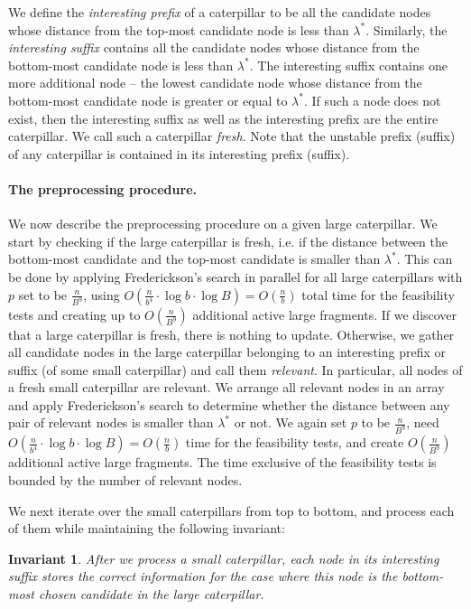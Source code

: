 \documentclass[11pt,a4paper]{article}
\newtheorem{invariant}{Invariant}
\theoremstyle{definition}
\theoremstyle{remark}
\begin{document}
We define the \emph{interesting prefix} of a caterpillar to be all the candidate nodes whose distance from the top-most candidate node is less than $\lambda^*$.
Similarly, the \emph{interesting suffix} contains all the candidate nodes whose distance from the bottom-most candidate node is less than $\lambda^*$. The interesting suffix contains one more additional node -- the lowest candidate node whose distance from the bottom-most candidate node is greater or equal to $\lambda^*$. If such a node does not exist, then the interesting suffix as well as the interesting prefix are the entire caterpillar. We call such a caterpillar \emph{fresh}. Note that the unstable prefix (suffix) of any caterpillar is contained in its interesting prefix (suffix).

\paragraph{The preprocessing procedure.}
We now describe the preprocessing procedure on a given large caterpillar. We start by checking if the large caterpillar is fresh, i.e. if the distance between the bottom-most candidate and the top-most candidate is smaller than $\lambda^*$. This can be
done by applying Frederickson's search in parallel for all large caterpillars with $p$ set to
be $\frac{n}{B^{9}}$, using $O(\frac{n}{b^{4}}\cdot \log b \cdot \log B)=O(\frac{n}{b})$
total time for the feasibility tests and creating up to $O(\frac{n}{B^{9}})$ additional active large
fragments. If we discover that a large caterpillar is fresh, there is nothing to update. 
Otherwise, we gather all candidate nodes in the large caterpillar belonging to
an interesting prefix or suffix (of some small caterpillar) and call them \emph{relevant}. In particular,
all nodes of a fresh small caterpillar are relevant.
We arrange all relevant nodes in an array and apply Frederickson's search to determine whether the distance between any  pair of relevant nodes is smaller than $\lambda^*$ or not. We again
set $p$ to be $\frac{n}{B^{9}}$, need $O(\frac{n}{b^{4}}\cdot \log b \cdot \log B)=O(\frac{n}{b})$
time for the feasibility tests, and create $O(\frac{n}{B^{9}})$ additional active large fragments.
The time exclusive of the feasibility tests is bounded by the number of relevant nodes.


We next iterate over the small caterpillars from top to bottom, and process each of them while maintaining the following invariant:
\begin{invariant} \label{invariant small caterpillar is correct after prep.} After we process a small caterpillar, each node in its interesting suffix stores the correct information for the case where this node is the bottom-most chosen candidate in the large caterpillar. 
\end{invariant}
\end{document}
